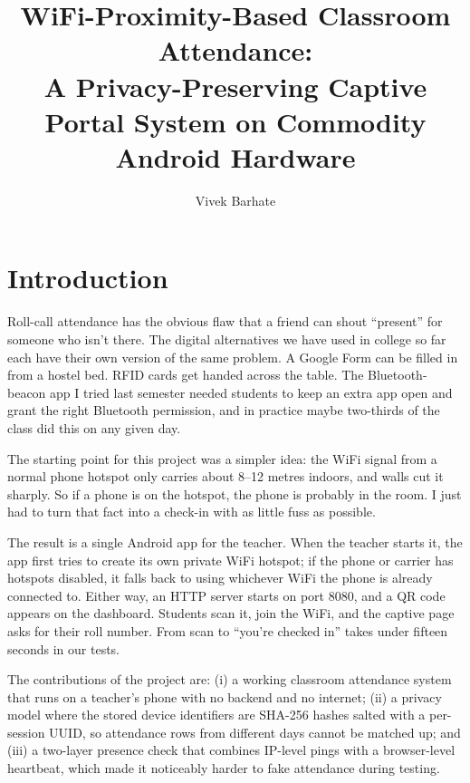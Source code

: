 \documentclass[sigconf,10pt]{acmart}
\title{WiFi-Proximity-Based Classroom Attendance:\\
       A Privacy-Preserving Captive Portal System on Commodity Android Hardware}
\author{Vivek Barhate}
\affiliation{%
  \institution{Department of Computer Engineering}
  \city{}\country{}
}
\begin{document}
\maketitle

\section{Introduction}

Roll-call attendance has the obvious flaw that a friend can shout
``present'' for someone who isn't there. The digital alternatives we
have used in college so far each have their own version of the same
problem. A Google Form can be filled in from a hostel bed. RFID
cards get handed across the table. The Bluetooth-beacon app I tried
last semester needed students to keep an extra app open and grant
the right Bluetooth permission, and in practice maybe two-thirds of
the class did this on any given day.

The starting point for this project was a simpler idea: the WiFi
signal from a normal phone hotspot only carries about 8--12 metres
indoors, and walls cut it sharply. So if a phone is on the hotspot,
the phone is probably in the room. I just had to turn that fact
into a check-in with as little fuss as possible.

The result is a single Android app for the teacher. When the
teacher starts it, the app first tries to create its own private
WiFi hotspot; if the phone or carrier has hotspots disabled, it
falls back to using whichever WiFi the phone is already connected
to. Either way, an HTTP server starts on port 8080, and a QR code
appears on the dashboard. Students scan it, join the WiFi, and the
captive page asks for their roll number. From scan to ``you're
checked in'' takes under fifteen seconds in our tests.

The contributions of the project are: (i) a working classroom
attendance system that runs on a teacher's phone with no backend
and no internet; (ii) a privacy model where the stored device
identifiers are SHA-256 hashes salted with a per-session UUID, so
attendance rows from different days cannot be matched up; and
(iii) a two-layer presence check that combines IP-level pings with
a browser-level heartbeat, which made it noticeably harder to fake
attendance during testing.

\end{document}
